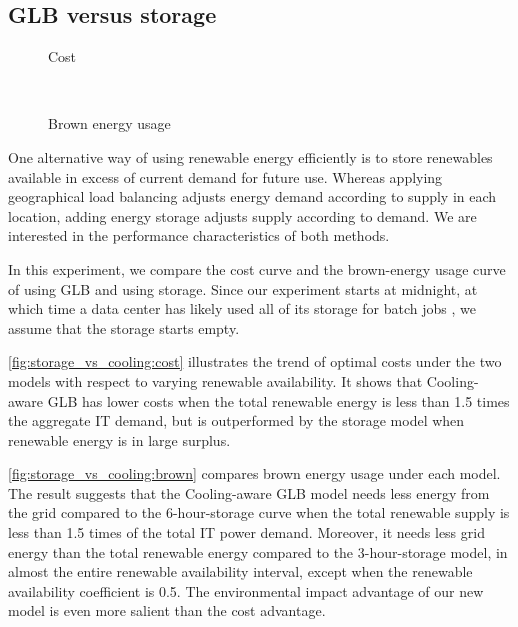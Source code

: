 \documentclass{acm_proc_article-sp}
\begin{document}
\subsection{GLB versus storage}

\begin{figure*}
	\centering
	\begin{subfigure}[b]{0.5\textwidth}
		\centering
		\caption{Cost}
		\label{fig:storage_vs_cooling:cost}
	\end{subfigure}%
	~ %
	\begin{subfigure}[b]{0.5\textwidth}
		\centering
		\caption{Brown energy usage}
		\label{fig:storage_vs_cooling:brown}
	\end{subfigure}
	\caption{Comparison of optimal cost (\ref{fig:storage_vs_cooling:cost}) and brown energy usage (\ref{fig:storage_vs_cooling:brown}) under the storage model and the Cooling-aware GLB model}
	\label{fig:storage_vs_cooling}
\end{figure*}

One alternative way of using renewable energy efficiently is to store renewables available in excess of current demand for future use. Whereas applying geographical load balancing adjusts energy demand according to supply in each location, adding energy storage adjusts supply according to demand. We are interested in the performance characteristics of both methods.

In this experiment, we compare the cost curve and the brown-energy usage curve of using GLB and using storage. Since our experiment starts at midnight, at which time a data center has likely used all of its storage for batch jobs \cite{adam:cooling}, we assume that the storage starts empty.

\autoref{fig:storage_vs_cooling:cost} illustrates the trend of optimal costs under the two models with respect to varying renewable availability. It shows that Cooling-aware GLB has lower costs when the total renewable energy is less than 1.5 times the aggregate IT demand, but is outperformed by the storage model when renewable energy is in large surplus.

\autoref{fig:storage_vs_cooling:brown} compares brown energy usage under each model. The result suggests that the Cooling-aware GLB model needs less energy from the grid compared to the 6-hour-storage curve when the total renewable supply is less than 1.5 times of the total IT power demand. Moreover, it needs less grid energy than the total renewable energy compared to the 3-hour-storage model, in almost the entire renewable availability interval, except when the renewable availability coefficient is 0.5. The environmental impact advantage of our new model is even more salient than the cost advantage.
\end{document}
